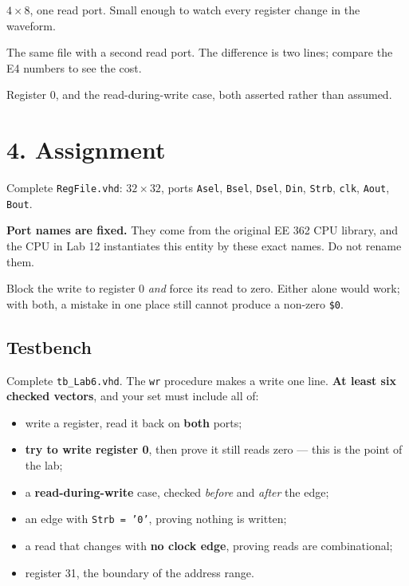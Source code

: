 \documentclass[11pt]{article}
\newcommand{\code}[1]{\texttt{#1}}
\begin{document}
\begin{description}[leftmargin=2.4em,style=nextline,itemsep=2pt]
\item[Example 1 --- \code{regfile\_small}] $4 \times 8$, one read port. Small
enough to watch every register change in the waveform.
\item[Example 2 --- \code{regfile\_two\_ports}] The same file with a second read
port. The difference is two lines; compare the E4 numbers to see the cost.
\item[Example 3 --- \code{read\_during\_write}] Register 0, and the
read-during-write case, both asserted rather than assumed.
\end{description}

\section*{4. Assignment}

Complete \code{RegFile.vhd}: $32 \times 32$, ports \code{Asel}, \code{Bsel},
\code{Dsel}, \code{Din}, \code{Strb}, \code{clk}, \code{Aout}, \code{Bout}.

\textbf{Port names are fixed.} They come from the original EE 362 CPU library,
and the CPU in Lab 12 instantiates this entity by these exact names. Do not
rename them.

Block the write to register 0 \emph{and} force its read to zero. Either alone
would work; with both, a mistake in one place still cannot produce a non-zero
\code{\$0}.

\subsection*{Testbench}

Complete \code{tb\_Lab6.vhd}. The \code{wr} procedure makes a write one line.
\textbf{At least six checked vectors}, and your set must include all of:

\begin{itemize}[leftmargin=1.4em,itemsep=1pt]
\item write a register, read it back on \textbf{both} ports;
\item \textbf{try to write register 0}, then prove it still reads zero --- this
is the point of the lab;
\item a \textbf{read-during-write} case, checked \emph{before} and \emph{after}
the edge;
\item an edge with \code{Strb = '0'}, proving nothing is written;
\item a read that changes with \textbf{no clock edge}, proving reads are
combinational;
\item register 31, the boundary of the address range.
\end{itemize}
\end{document}
